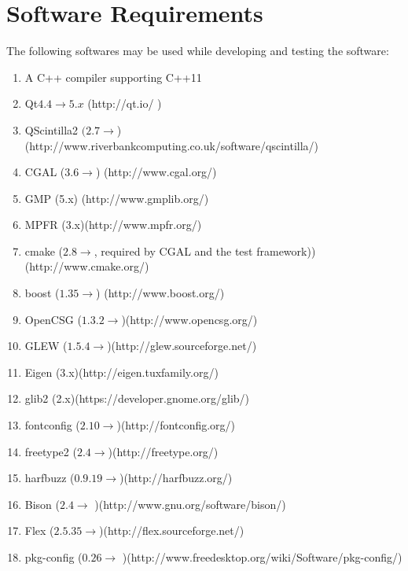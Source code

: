 \documentclass[12pt,includeheadfoot,a4paper]{report}
\begin{document}
\section{Software Requirements}
The following softwares may be used while developing and testing the software:
\begin{enumerate} 
	\item A C++ compiler supporting C++11
	
	\item Qt$  4.4 \rightarrow 5.x $ (http://qt.io/ )
	
	\item QScintilla2 $ (2.7 \rightarrow $)(http://www.riverbankcomputing.co.uk/software/qscintilla/)
	
	\item CGAL ($ 3.6 \rightarrow $) (http://www.cgal.org/)
	
	\item GMP (5.x) (http://www.gmplib.org/)
	
	\item MPFR (3.x)(http://www.mpfr.org/)
	
	\item cmake ($ 2.8 \rightarrow $, required by CGAL and the test framework))(http://www.cmake.org/)
	
	\item boost ($ 1.35 \rightarrow $) (http://www.boost.org/)
	
	\item OpenCSG ($ 1.3.2 \rightarrow $)(http://www.opencsg.org/)
	
	\item GLEW ($ 1.5.4 \rightarrow $)(http://glew.sourceforge.net/)
	
	\item Eigen (3.x)(http://eigen.tuxfamily.org/)
	
	\item glib2 (2.x)(https://developer.gnome.org/glib/)
	
	\item fontconfig ($ 2.10 \rightarrow  $)(http://fontconfig.org/)
	
	\item freetype2 ($ 2.4 \rightarrow  $)(http://freetype.org/)
	
	\item harfbuzz ($ 0.9.19 \rightarrow  $)(http://harfbuzz.org/)
	
	\item Bison ($ 2.4 \rightarrow $ )(http://www.gnu.org/software/bison/)
	
	\item Flex ($ 2.5.35 \rightarrow  $)(http://flex.sourceforge.net/)
	
	\item pkg-config ($ 0.26 \rightarrow $ )(http://www.freedesktop.org/wiki/Software/pkg-config/)
	
\end{enumerate}
\end{document}
